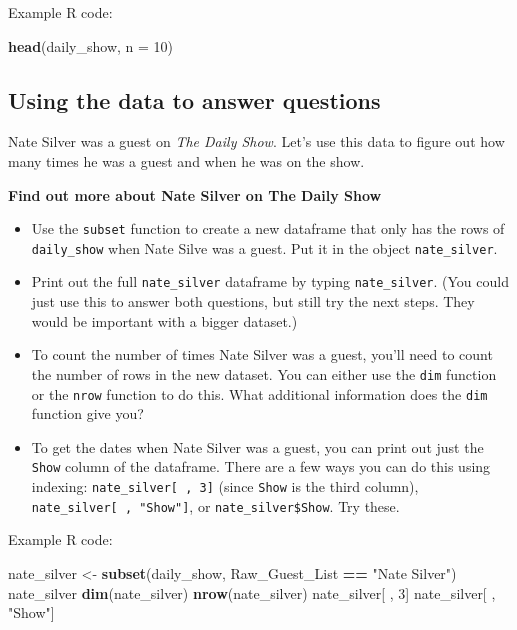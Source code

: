 \documentclass[]{book}
\makeatletter
\newenvironment{Shaded}{\begin{snugshade}}{\end{snugshade}}
\newcommand{\KeywordTok}[1]{\textcolor[rgb]{0.13,0.29,0.53}{\textbf{#1}}}
\newcommand{\DataTypeTok}[1]{\textcolor[rgb]{0.13,0.29,0.53}{#1}}
\newcommand{\DecValTok}[1]{\textcolor[rgb]{0.00,0.00,0.81}{#1}}
\newcommand{\StringTok}[1]{\textcolor[rgb]{0.31,0.60,0.02}{#1}}
\newcommand{\OperatorTok}[1]{\textcolor[rgb]{0.81,0.36,0.00}{\textbf{#1}}}
\newcommand{\NormalTok}[1]{#1}
\providecommand{\tightlist}{%
  \setlength{\itemsep}{0pt}\setlength{\parskip}{0pt}}
\newenvironment{kframe}{%
\medskip{}
\setlength{\fboxsep}{.8em}
 \def\at@end@of@kframe{}%
 \ifinner\ifhmode%
  \def\at@end@of@kframe{\end{minipage}}%
  \begin{minipage}{\columnwidth}%
 \fi\fi%
 \def\FrameCommand##1{\hskip\@totalleftmargin \hskip-\fboxsep
 \colorbox{shadecolor}{##1}\hskip-\fboxsep
     \hskip-\linewidth \hskip-\@totalleftmargin \hskip\columnwidth}%
 \MakeFramed {\advance\hsize-\width
   \@totalleftmargin\z@ \linewidth\hsize
   \@setminipage}}%
 {\par\unskip\endMakeFramed%
 \at@end@of@kframe}
\renewenvironment{Shaded}{\begin{kframe}}{\end{kframe}}
\theoremstyle{definition}
\theoremstyle{definition}
\theoremstyle{definition}
\theoremstyle{remark}
\makeatother
\begin{document}
Example R code:

\begin{Shaded}
\begin{Highlighting}[]
\KeywordTok{head}\NormalTok{(daily_show, }\DataTypeTok{n =} \DecValTok{10}\NormalTok{)}
\end{Highlighting}
\end{Shaded}

\subsection{Using the data to answer
questions}\label{using-the-data-to-answer-questions}

Nate Silver was a guest on \emph{The Daily Show}. Let's use this data to
figure out how many times he was a guest and when he was on the show.

\textbf{Find out more about Nate Silver on The Daily Show}

\begin{itemize}
\tightlist
\item
  Use the \texttt{subset} function to create a new dataframe that only
  has the rows of \texttt{daily\_show} when Nate Silve was a guest. Put
  it in the object \texttt{nate\_silver}.
\item
  Print out the full \texttt{nate\_silver} dataframe by typing
  \texttt{nate\_silver}. (You could just use this to answer both
  questions, but still try the next steps. They would be important with
  a bigger dataset.)
\item
  To count the number of times Nate Silver was a guest, you'll need to
  count the number of rows in the new dataset. You can either use the
  \texttt{dim} function or the \texttt{nrow} function to do this. What
  additional information does the \texttt{dim} function give you?
\item
  To get the dates when Nate Silver was a guest, you can print out just
  the \texttt{Show} column of the dataframe. There are a few ways you
  can do this using indexing: \texttt{nate\_silver{[}\ ,\ 3{]}} (since
  \texttt{Show} is the third column),
  \texttt{nate\_silver{[}\ ,\ "Show"{]}}, or
  \texttt{nate\_silver\$Show}. Try these.
\end{itemize}

Example R code:

\begin{Shaded}
\begin{Highlighting}[]
\NormalTok{nate_silver <-}\StringTok{ }\KeywordTok{subset}\NormalTok{(daily_show, }
\NormalTok{                      Raw_Guest_List }\OperatorTok{==}\StringTok{ "Nate Silver"}\NormalTok{)}
\NormalTok{nate_silver}
\KeywordTok{dim}\NormalTok{(nate_silver)}
\KeywordTok{nrow}\NormalTok{(nate_silver)}
\NormalTok{nate_silver[ , }\DecValTok{3}\NormalTok{]}
\NormalTok{nate_silver[ , }\StringTok{"Show"}\NormalTok{]}
\end{Highlighting}
\end{Shaded}
\end{document}

